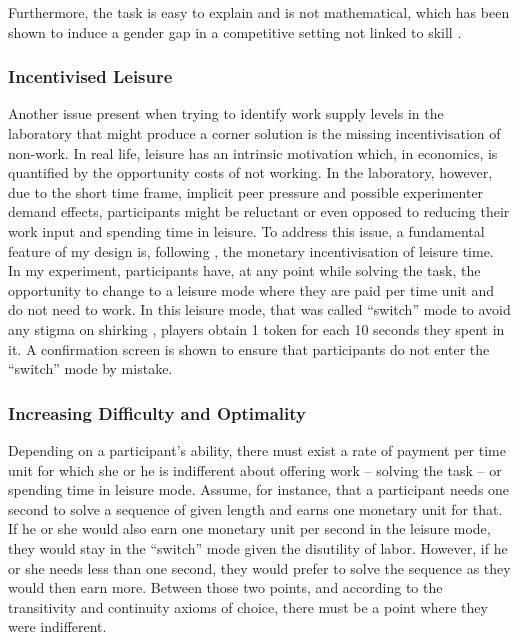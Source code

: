     Furthermore, the task is easy to explain and is not mathematical, which has been shown to induce a gender gap in a competitive setting not linked to skill \citep{niederle2010}.\\ 
    
    \subsubsection{Incentivised Leisure}
    \label{ss:switch_mode}
    
    Another issue present when trying to identify work supply levels in the laboratory that might produce a corner solution is the missing incentivisation of non-work. In real life, leisure has an intrinsic motivation which, in economics, is quantified by the opportunity costs of not working. In the laboratory, however, due to the short time frame, implicit peer pressure and possible experimenter demand effects, participants might be reluctant or even opposed to reducing their work input and spending time in leisure. To address this issue, a fundamental feature of my design is, following \cite{sausgruber}, the monetary incentivisation of leisure time.\\
    
    In my experiment, participants have, at any point while solving the task, the opportunity to change to a leisure mode where they are paid per time unit and do not need to work. In this leisure mode, that was called ``switch'' mode to avoid any stigma on shirking \citep{rey-biel2016, eriksson2009}, players obtain 1 token for each 10 seconds they spent in it. A confirmation screen is shown to ensure that participants do not enter the ``switch'' mode by mistake.
    
    \subsubsection{Increasing Difficulty and Optimality}
    
    Depending on a participant's ability, there must exist a rate of payment per time unit for which she or he is indifferent about offering work -- solving the task -- or spending time in leisure mode. Assume, for instance, that a participant needs one second to solve a sequence of given length and earns one monetary unit for that. If he or she would also earn one monetary unit per second in the leisure mode, they would stay in the ``switch'' mode given the disutility of labor. However, if he or she needs less than one second, they would prefer to solve the sequence as they would then earn more. Between those two points, and according to the transitivity and continuity axioms of choice, there must be a point where they were indifferent.\\
    
